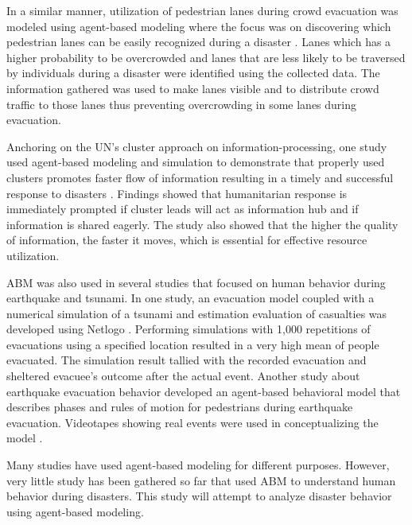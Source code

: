 \documentclass[runningheads]{llncs}
\begin{document}
	In a similar manner, utilization of pedestrian lanes during crowd evacuation was modeled using agent-based modeling where the focus was on discovering which pedestrian lanes can be easily recognized during a disaster \cite{wu2012personalized}. Lanes which has a higher probability to be overcrowded and lanes that are less likely to be traversed by individuals during a disaster were identified using the collected data. The information gathered was used to make lanes visible and to distribute crowd traffic to those lanes thus preventing overcrowding in some lanes during evacuation.
	
	Anchoring on the UN’s cluster approach on information-processing, one study used agent-based modeling and simulation to demonstrate that properly used clusters promotes faster flow of information resulting in a timely and successful response to disasters \cite{altay2014information}. Findings showed that humanitarian response is immediately prompted if cluster leads will act as information hub and if information is shared eagerly. The study also showed that the higher the quality of information, the faster it moves, which is essential for effective resource utilization.
	
	ABM was also used in several studies that focused on human behavior during earthquake and tsunami. In one study, an evacuation model coupled with a numerical simulation of a tsunami and estimation evaluation of casualties was developed using Netlogo \cite{mas2012agent}. Performing simulations with 1,000 repetitions of evacuations using a specified location resulted in a very high mean of people evacuated. The simulation result tallied with the recorded evacuation and sheltered evacuee’s outcome after the actual event. Another study about earthquake evacuation behavior developed an agent-based behavioral model that describes phases and rules of motion for pedestrians during earthquake evacuation. Videotapes showing real events were used in conceptualizing the model \cite{d2014agent}. 

    
    Many studies have used agent-based modeling for different purposes. However, very little study has been gathered so far that used ABM to understand human behavior during disasters. This study will attempt to analyze disaster behavior using agent-based modeling.
    
\end{document}
